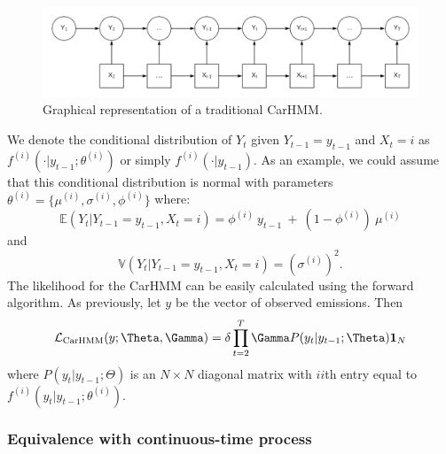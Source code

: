 \begin{figure}[ht]
	\centering
	\includegraphics[width=5in]{../Plots/CarHMM.png}
	\caption{Graphical representation of a traditional CarHMM.}
	\label{fig:CarHMM}
\end{figure}

%
We denote the conditional distribution of $Y_t$ given $Y_{t-1}= y_{t-1}$ and $ X_t=i$ as $f^{(i)}( \cdot | y_{t-1}; \theta^{(i)})$ or simply $f^{(i)}( \cdot | y_{t-1})$.
As an example, we could assume that this conditional distribution is normal with parameters $\theta^{(i)} = \{\mu^{(i)},\sigma^{(i)},\phi^{(i)}\}$ where:
%
\[
\mathbb{E}(Y_t|Y_{t-1} = y_{t-1},X_t=i) = \phi^{(i)} ~ y_{t-1} ~+ ~(1-\phi^{(i)})  ~\mu^{(i)}
\]
and
\[
\mathbb{V}(Y_t| Y_{t-1} =y_{t-1}, X_t = i) = (\sigma^{(i)})^2.
\]
%
The likelihood for the CarHMM can be easily calculated using the forward algorithm. As previously, let $y$ be the vector of observed emissions. Then
\begin{equation}
\calL_{\text{CarHMM}}(y;\Theta,\Gamma) = \delta \prod_{t=2}^T \Gamma P(y_t|y_{t-1};\Theta) \mathbf{1}_N
\label{CarHMM_likelihood}
\end{equation}
where
%
$P(y_t|y_{t-1};\Theta)$ is an $N \times N$ diagonal matrix with $ii$th entry equal to $f^{(i)}(y_t|y_{t-1}; \theta^{(i)})$.
%
\subsubsection{Equivalence with continuous-time process}


